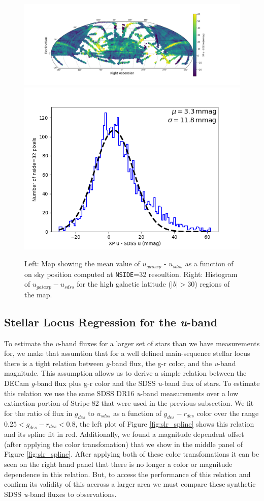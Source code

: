 \begin{figure}
    \includegraphics[width=0.64\linewidth]{./figures/u-band/uxp-usdss_full_map.png}
    \includegraphics[width=0.32\linewidth]{./figures/u-band/uxp-usdss_highglat_hist.png}
    \caption{Left: Map showing the mean value of $u_{gaiaxp}$ - $u_{sdss}$ as a function of on sky position computed at \texttt{NSIDE}=32 resoultion.  
    Right: Histogram of $u_{gaiaxp} - u_{sdss}$ for the high galactic latitude ($|b| > 30$) regions of the map.}
    \label{fig:sdss-gaiaxp-u}
\end{figure}



\subsection{Stellar Locus Regression for the \textit{u}-band}
\label{sec:slr}
To estimate the \textit{u}-band fluxes for a larger set of stars than we have measurements for, we make that assumtion that for a well defined main-sequence stellar locus there is a tight relation between \textit{g}-band flux, the g-r color, and the \textit{u}-band magnitude.
This assumption allows us to derive a simple relation between the DECam \textit{g}-band flux plus g-r color and the SDSS \textit{u}-band flux of stars. 
To estimate this relation we use the same SDSS DR16 \textit{u}-band measurements over a low extinction portion of Stripe-82 that were used in the previous subsection. 
We fit for the ratio of flux in $g_{des}$ to $u_{sdss}$ as a function of $g_{des}-r_{des}$ color over the range $0.25 <  g_{des}-r_{des} < 0.8$, the left plot of Figure \ref{fig:slr_spline} shows this relation and its spline fit in red. 
Additionally, we found a magnitude dependent offset (after applying the color transfomation) that we show in the middle panel of Figure \ref{fig:slr_spline}. 
After applying both of these color transfomations it can be seen on the right hand panel that there is no longer a color or magnitude dependence in this relation. 
But, to access the performance of this relation and confirm its validity of this accross a larger area we must compare these synthetic SDSS \textit{u}-band fluxes to observations.

